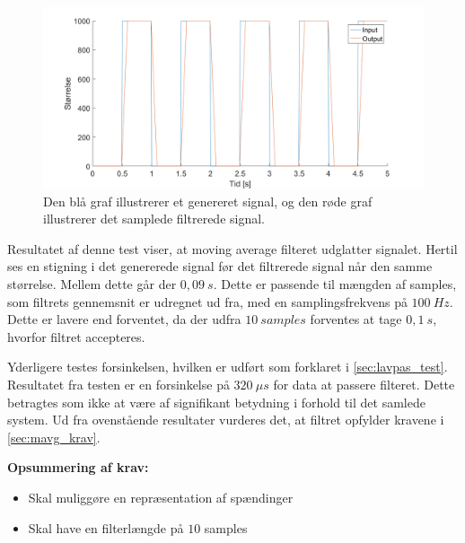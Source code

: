 \begin{figure}[H]
	\centering
	\includegraphics[width=1\textwidth]{figures/forsinkelse}
	\caption{Den blå graf illustrerer et genereret signal, og den røde graf illustrerer det samplede filtrerede signal.}
	\label{fig:forsinkelse}
\end{figure}

\noindent
Resultatet af denne test viser, at moving average filteret udglatter signalet. 
Hertil ses en stigning i det genererede signal før det filtrerede signal når den samme størrelse. 
Mellem dette går der $0,09~s$. 
Dette er passende til mængden af samples, som filtrets gennemsnit er udregnet ud fra, med en samplingsfrekvens på $100~Hz$. 
Dette er lavere end forventet, da der udfra $10~samples$ forventes at tage $0,1~s$, hvorfor filtret accepteres.  

Yderligere testes forsinkelsen, hvilken er udført som forklaret i \autoref{sec:lavpas_test}. 
Resultatet fra testen er en forsinkelse på $320~\mu s$ for data at passere filteret. 
Dette betragtes som ikke at være af signifikant betydning i forhold til det samlede system.    
Ud fra ovenstående resultater vurderes det, at filtret opfylder kravene i \autoref{sec:mavg_krav}. 

\vspace{3mm}
\textbf{Opsummering af krav:}
\begin{itemize}
\item[\text{\sffamily \checkmark}] Skal muliggøre en repræsentation af spændinger 
\item[\text{\sffamily \checkmark}] Skal have en filterlængde på $10$ samples
\end{itemize}